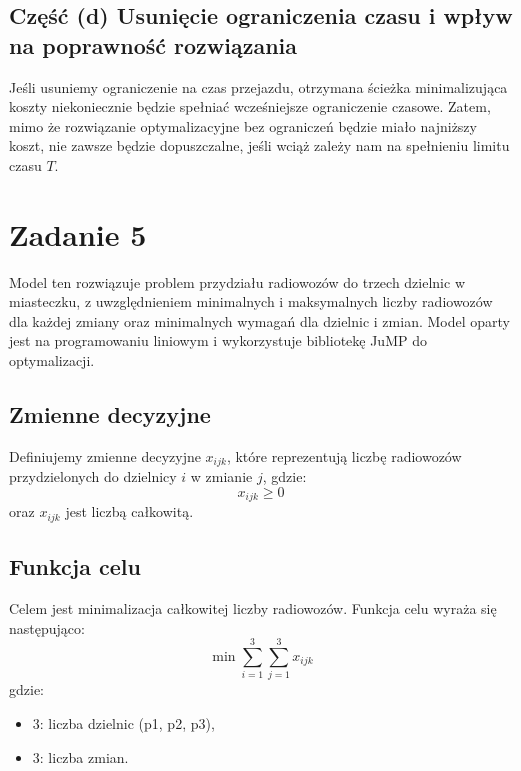 \documentclass[12pt, letterpaper]{article}
\begin{document}
\subsection*{Część (d) Usunięcie ograniczenia czasu i wpływ na poprawność
  rozwiązania}
Jeśli usuniemy ograniczenie na czas przejazdu, otrzymana ścieżka minimalizująca
koszty niekoniecznie będzie spełniać wcześniejsze ograniczenie czasowe. Zatem,
mimo że rozwiązanie optymalizacyjne bez ograniczeń będzie miało najniższy
koszt, nie zawsze będzie dopuszczalne, jeśli wciąż zależy nam na spełnieniu
limitu czasu \( T \).

\section{Zadanie 5}

Model ten rozwiązuje problem przydziału radiowozów do trzech dzielnic w
miasteczku, z uwzględnieniem minimalnych i maksymalnych liczby radiowozów dla
każdej zmiany oraz minimalnych wymagań dla dzielnic i zmian. Model oparty jest
na programowaniu liniowym i wykorzystuje bibliotekę JuMP do optymalizacji.

\subsection*{Zmienne decyzyjne}
Definiujemy zmienne decyzyjne \( x_{ijk} \), które reprezentują liczbę
radiowozów przydzielonych do dzielnicy \( i \) w zmianie \( j \), gdzie:
\[
  x_{ijk} \geq 0
\]
oraz \( x_{ijk} \) jest liczbą całkowitą.

\subsection*{Funkcja celu}
Celem jest minimalizacja całkowitej liczby radiowozów. Funkcja celu wyraża się
następująco:
\[
  \min \sum_{i=1}^{3} \sum_{j=1}^{3} x_{ijk}
\]
gdzie:
\begin{itemize}
  \item \( 3 \): liczba dzielnic (p1, p2, p3),
  \item \( 3 \): liczba zmian.
\end{itemize}
\end{document}
